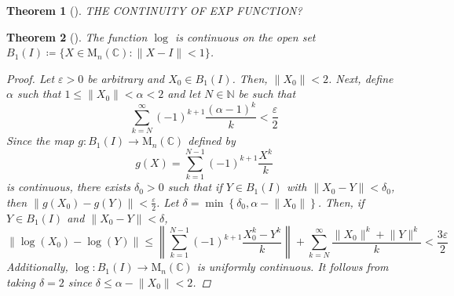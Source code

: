 \documentclass[letterpaper, 10pt]{article}
\theoremstyle{theostyle}
\newtheorem{theorem}{Theorem}[section]
\newenvironment{thmstyle}[1][]{%
    \begin{theorem}[#1]\leavevmode\vspace{-\baselineskip}\myquote%
    }{\endmyquote\end{theorem}}
\begin{document}
\begin{thmstyle}
    THE CONTINUITY OF EXP FUNCTION?
\end{thmstyle}

\begin{thmstyle}
    The function \(\log\) is continuous on the open set \(B_1 (I) \coloneqq \{X \in \mathrm{M}_n (\mathbb{C}) : \lVert X - I \rVert < 1\}\).

    \begin{proof}
        Let \(\varepsilon > 0\) be arbitrary and \(X_0 \in B_1(I)\).
        Then, \(\lVert X_0 \rVert < 2\).
        Next, define \(\alpha\) such that \(1 \leq \lVert X_0 \rVert < \alpha < 2\) and let \(N \in \mathbb{N}\) be such that
        \[\sum_{k=N}^{\infty} (-1)^{k+1} \frac{(\alpha - 1)^k}{k} < \frac{\varepsilon}{2}\]
        Since the map \(g : B_1(I) \rightarrow \mathrm{M}_n(\mathbb{C})\) defined by 
        \[g(X) = \sum_{k=1}^{N-1} (-1)^{k+1} \frac{X^k}{k}\]
        is continuous, there exists \(\delta_0 > 0\) such that if \(Y \in B_1(I)\) with \(\lVert X_0 - Y\rVert < \delta_0\), then \(\lVert g(X_0) - g(Y) \rVert < \frac{\varepsilon}{2}\).
        Let \(\delta = \min \left\{\delta_0, \alpha - \lVert X_0 \rVert\right\}\).
        Then, if \(Y \in B_1(I)\) and \(\lVert X_0 - Y \rVert < \delta\),
        \[\lVert \log{(X_0)} - \log{(Y)} \rVert \leq \left\lVert\sum_{k=1}^{N-1} (-1)^{k+1} \frac{X_0^k - Y^k}{k} \right\rVert + \sum_{k=N}^{\infty} \frac{\lVert X_0\rVert^{k} + \lVert Y \rVert^{k}}{k} < \frac{3\varepsilon}{2}\]
        Additionally, \(\log : B_1(I) \rightarrow \mathrm{M}_n (\mathbb{C})\) is uniformly continuous.
        It follows from taking \(\delta = 2\) since \(\delta \leq \alpha - \lVert X_0 \rVert < 2\).
    \end{proof}
\end{thmstyle}
\end{document}
